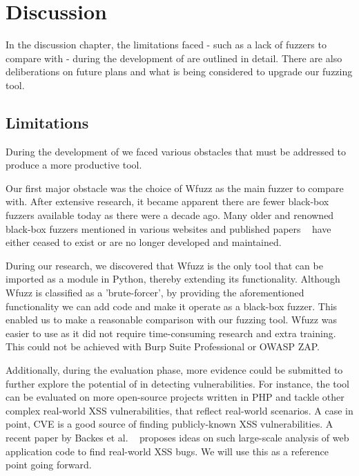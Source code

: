 \chapter{Discussion}
\label{sec:discussion}
\minitoc
\vspace*{1cm}

In the discussion chapter, the limitations faced - such as a lack of fuzzers to compare with - during the development of \pname{} are outlined in detail. There are also deliberations on future plans and what is being considered to upgrade our fuzzing tool.

\section{Limitations}
During the development of \pname{} we faced various obstacles that must be addressed to produce a more productive tool.

Our first major obstacle was the choice of Wfuzz as the main fuzzer to compare \pname{} with. After extensive research, it became apparent there are fewer black-box fuzzers available today as there were a decade ago. Many older and renowned black-box fuzzers mentioned in various websites and published papers ~\cite{doupe2010johnny, bau2010state, duchene2014kameleonfuzz} have either ceased to exist or are no longer developed and maintained. 

During our research, we discovered that Wfuzz is the only tool that can be imported as a module in Python, thereby extending its functionality. Although Wfuzz is classified as a 'brute-forcer', by providing the aforementioned functionality we can add code and make it operate as a black-box fuzzer. This enabled us to make a reasonable comparison with our fuzzing tool. Wfuzz was easier to use as it did not require time-consuming research and extra training. This could not be achieved with Burp Suite Professional or OWASP ZAP.

Additionally, during the evaluation phase, more evidence could be submitted to further explore the potential of \pname{} in detecting vulnerabilities. For instance, the tool can be evaluated on more open-source projects written in PHP and tackle other complex real-world XSS vulnerabilities, that reflect real-world scenarios. A case in point, CVE is a good source of finding publicly-known XSS vulnerabilities. A recent paper by Backes et al. ~\cite{efficient2017} proposes ideas on such large-scale analysis of web application code to find real-world XSS bugs. We will use this as a reference point going forward. 

